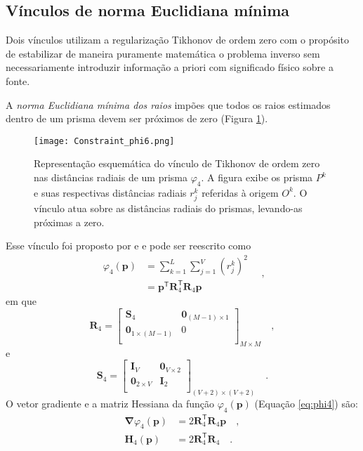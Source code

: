 \subsection{Vínculos de norma Euclidiana mínima}

Dois vínculos utilizam a regularização Tikhonov de ordem zero com o propósito de estabilizar de maneira puramente matemática o problema inverso sem necessariamente introduzir informação a priori com significado físico sobre a fonte. 

A \textit{norma Euclidiana mínima dos raios} impões que todos os raios estimados dentro de um prisma devem ser próximos de zero (Figura \ref{fig:phi4}).

\begin{figure}[!htb]
	\centering
	\texttt{[image: Constraint\_phi6.png]}
	\caption{Representação esquemática do vínculo de Tikhonov de ordem zero nas distâncias radiais de um prisma $\varphi_{4}$. A figura exibe os prisma $P^k$ e suas respectivas distâncias radiais $r_j^k$ referidas à origem $O^k$. O vínculo atua sobre as distâncias radiais do prismas, levando-as próximas a zero.}
	\label{fig:phi4}
\end{figure}

Esse vínculo foi proposto por \cite{oliveirajr_etal2011} e \cite{oliveirajr_barbosa2013} e pode ser reescrito como
\begin{equation}\label{eq:phi4}
\begin{split}
\varphi_{4}(\mathbf{p}) &= \sum\limits^{L}_{k=1}\sum\limits^{V}_{j=1}\left(r_{j}^{k}\right)^2 \\
&= \mathbf{p}^{\mathsf{T}} \mathbf{R}_{4}^{\mathsf{T}} \mathbf{R}_{4} \mathbf{p}
\end{split} \quad ,
\end{equation}
em que
\begin{equation}
\mathbf{R}_{4} = 
\begin{bmatrix}
\mathbf{S}_{4} & \mathbf{0}_{(M-1) \times 1} \\
\mathbf{0}_{1 \times (M-1)} & 0 \\
\end{bmatrix}_{M\times M} \quad ,
\label{eq:R4-matrix}
\end{equation}
e
\begin{equation}
\mathbf{S}_{4} = 
\begin{bmatrix}
\mathbf{I}_{V} & \mathbf{0}_{V \times 2} \\
\mathbf{0}_{2 \times V} & \mathbf{I}_{2} \\
\end{bmatrix}_{ (V+2)\times (V+2)} \quad .
\label{eq:S4-matrix}
\end{equation}
O vetor gradiente e a matriz Hessiana da função $\varphi_{4}(\mathbf{p})$ (Equação \ref{eq:phi4}) são:
\begin{equation}\label{eq:phi4_gh}
\begin{split}
\boldsymbol{\nabla}\varphi_{4}(\mathbf{p}) &= 2\mathbf{R}^\mathsf{T}_{4}\mathbf{R}_{4}\mathbf{p} \quad ,\\
\mathbf{H}_{4}(\mathbf{p}) &= 2\mathbf{R}^\mathsf{T}_{4}\mathbf{R}_{4} \quad .
\end{split}
\end{equation}

